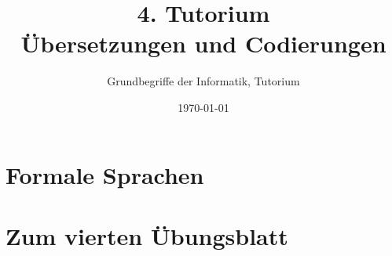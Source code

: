 




\title[Übersetzungen und Codierungen]{4. Tutorium\\ Übersetzungen und Codierungen}
\subtitle{Grundbegriffe der Informatik, Tutorium \hashtag\mytutnumber}
\date{\today}


\titleframe
\roadmap

\section{Formale Sprachen}




% 

% 

% 

 \section{Zum vierten Übungsblatt}
 

	
